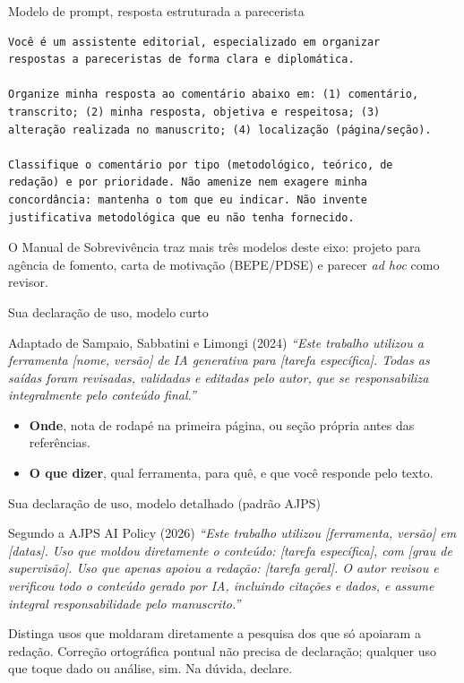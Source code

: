 \documentclass[11pt,aspectratio=169,t]{beamer}
\begin{document}
\begin{frame}[fragile]{Modelo de prompt, resposta estruturada a parecerista}
\begin{lstlisting}
Você é um assistente editorial, especializado em organizar
respostas a pareceristas de forma clara e diplomática.

Organize minha resposta ao comentário abaixo em: (1) comentário,
transcrito; (2) minha resposta, objetiva e respeitosa; (3)
alteração realizada no manuscrito; (4) localização (página/seção).

Classifique o comentário por tipo (metodológico, teórico, de
redação) e por prioridade. Não amenize nem exagere minha
concordância: mantenha o tom que eu indicar. Não invente
justificativa metodológica que eu não tenha fornecido.
\end{lstlisting}
\centering\small O Manual de Sobrevivência traz mais três modelos deste eixo: projeto para agência de fomento, carta de motivação (BEPE/PDSE) e parecer \textit{ad hoc} como revisor.
\end{frame}

\begin{frame}{Sua declaração de uso, modelo curto}
  \begin{exampleblock}{Adaptado de Sampaio, Sabbatini e Limongi (2024)}
    \itshape ``Este trabalho utilizou a ferramenta [nome, versão] de IA generativa para [tarefa específica]. Todas as saídas foram revisadas, validadas e editadas pelo autor, que se responsabiliza integralmente pelo conteúdo final.''
  \end{exampleblock}
  \pause
  \vfill
  \begin{itemize}
    \item \textbf{Onde}, nota de rodapé na primeira página, ou seção própria antes das referências.
    \item \textbf{O que dizer}, qual ferramenta, para quê, e que você responde pelo texto.
  \end{itemize}
\end{frame}

\begin{frame}{Sua declaração de uso, modelo detalhado (padrão AJPS)}
  \begin{exampleblock}{Segundo a AJPS AI Policy (2026)}
    \small\itshape ``Este trabalho utilizou [ferramenta, versão] em [datas]. Uso que moldou diretamente o conteúdo: [tarefa específica], com [grau de supervisão]. Uso que apenas apoiou a redação: [tarefa geral]. O autor revisou e verificou todo o conteúdo gerado por IA, incluindo citações e dados, e assume integral responsabilidade pelo manuscrito.''
  \end{exampleblock}
  \pause
  \vfill
  \centering\small Distinga usos que moldaram diretamente a pesquisa dos que só apoiaram a redação. Correção ortográfica pontual não precisa de declaração; qualquer uso que toque dado ou análise, sim. Na dúvida, declare.
\end{frame}
\end{document}

